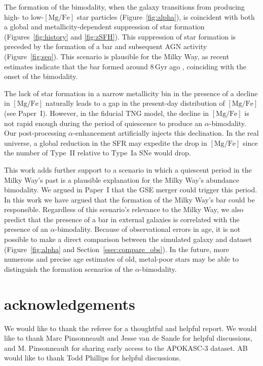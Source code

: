 \documentclass[twocolumn]{aastex631}
\newcommand{\Gyr}{\ensuremath{\textrm{Gyr}}}
\newcommand{\MgFe}{\ensuremath{[\textrm{Mg}/\textrm{Fe}]}}
\begin{document}
The formation of the bimodality, when the galaxy transitions from producing high- to low-\MgFe{} star particles (Figure~\ref{fig:alpha}), is coincident with both a global and metallicity-dependent suppression of star formation (Figures~\ref{fig:history} and \ref{fig:zSFH}). This suppression of star formation is preceded by the formation of a bar and subsequent AGN activity (Figure~\ref{fig:seq}). This scenario is plausible for the Milky Way, as recent estimates indicate that the bar formed around $8\,\Gyr$ ago \citep{2019MNRAS.490.4740B,2024MNRAS.530.2972S}, coinciding with the onset of the bimodality.

The lack of star formation in a narrow metallicity bin in the presence of a decline in \MgFe{} naturally leads to a gap in the present-day distribution of \MgFe{} (see Paper~I). However, in the fiducial TNG  model, the decline in \MgFe{} is not rapid enough during the period of quiescence to produce an $\alpha$-bimodality. Our post-processing $\alpha$-enhancement artificially injects this declination. In the real universe, a global reduction in the SFR may expedite the drop in \MgFe{} since the number of Type~II relative to Type~Ia SNe would drop.

This work adds further support to a scenario in which a quiescent period in the Milky Way's past is a plausible explanation for the Milky Way's abundance bimodality. We argued in Paper~I that the GSE merger could trigger this period. In this work we have argued that the formation of the Milky Way's bar could be responsible. Regardless of this scenario's relevance to the Milky Way, we also predict that the presence of a bar in external galaxies is correlated with the presence of an $\alpha$-bimodality. Because of observational errors in age, it is not possible to make a direct comparison between the simulated galaxy and dataset (Figure~\ref{fig:alpha} and Section~\ref{ssec:compare_obs}). In the future, more numerous and precise age estimates of old, metal-poor stars may be able to distinguish the formation scenarios of the $\alpha$-bimodality.

\section*{acknowledgements}
  We would like to thank the referee for a thoughtful and helpful report. We would like to thank Marc Pinsonneault and Jesse van de Sande for helpful discussions, and M. Pinsonneault for sharing early access to the APOKASC-3 dataset. AB would like to thank Todd Phillips for helpful discussions.
\end{document}
